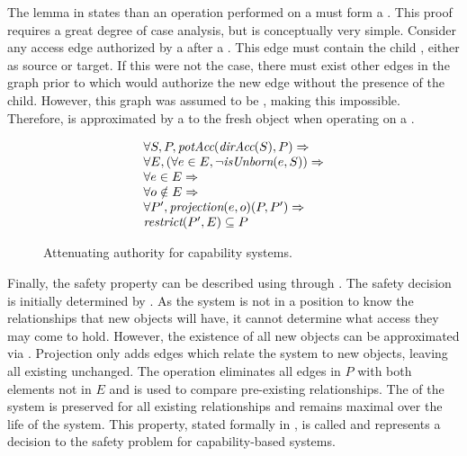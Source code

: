 The lemma in  states than an \NMendow{} operation performed on a \TMmaximal{} \TMaccessGraph{} must form a \TMprojection{}.
This proof requires a great degree of case analysis, but is conceptually very simple.
Consider any access edge authorized by a \TMtransfer{} after a \TMprojection{}.
This edge must contain the child \TMref{}, either as source or target.
If this were not the case, there must exist other edges in the graph prior to \TMprojection{} which would authorize the new edge without the presence of the child.
However, this graph was assumed to be \TMmaximal{}, making this impossible.
Therefore, \NMendow{} is approximated by a \TMprojection{} to the fresh object when operating on a \TMmaximal{} \TMaccessGraph{}.

\begin{figure}
  \[
  \begin{array}{l}
  \forall S, P,  \textit{potAcc}(\textit{dirAcc}(S),P) \Rightarrow \\
  \forall E, (\forall e \in E, \neg \textit{isUnborn}(e,S)) \Rightarrow \\
  \forall e \in E \Rightarrow \\
  \forall o \notin E \Rightarrow \\
  \forall P', \textit{projection}(e,o)(P,P') \Rightarrow\\
  \textit{restrict}(P',E) \subseteq P
  \end{array}
  \]
  \caption{Attenuating authority for capability systems. \label{fig:sketch:safety}}
\end{figure}

Finally, the safety property can be described using \TMpotAcc{} through \TMprojection{}.
The safety decision is initially determined by \TMpotAcc{}.
As the system is not in a position to know the relationships that new objects will have, it cannot determine what access they may come to hold.
However, the existence of all new objects can be approximated via \TMprojection{}.
Projection only adds edges which relate the system to new objects, leaving all existing \TMpotAcc{} unchanged.
The  operation eliminates all edges in \(P\) with both elements not in \(E\) and is used to compare pre-existing relationships.
The \TMpotAcc{} of the system is preserved for all existing relationships and remains maximal over the life of the system.
This property, stated formally in , is called  and represents a decision to the safety problem for capability-based systems.


